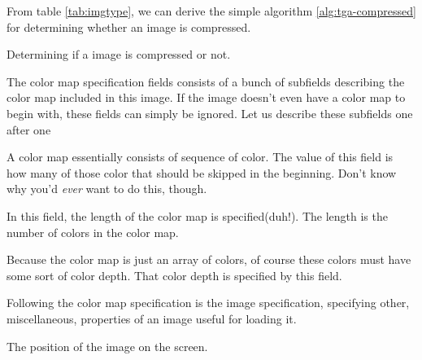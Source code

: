 \begin{refsection}
  From table \ref{tab:imgtype}, we can derive the simple algorithm
  \ref{alg:tga-compressed} for determining whether an image is
  compressed.

  \begin{algorithm}[H]
    \caption{Determining if a \tga image is compressed or not.}
    \label{alg:tga-compressed}
    \begin{algorithmic}[1]
    \end{algorithmic}
  \end{algorithm}


  The color map specification fields consists of a bunch of subfields
  describing the color map included in this image. If the image
  doesn't even have a color map to begin with, these fields can simply
  be ignored. Let us describe these subfields one after one


  A color map essentially consists of sequence of color. The value of
  this field is how many of those color that should be skipped in the
  beginning. Don't know why you'd \textit{ever} want to do this, though.


  In this field, the length of the color map is specified(duh!). The
  length is the number of colors in the color map.


  Because the color map is just an array of colors, of course these
  colors must have some sort of color depth. That color depth is
  specified by this field.


  Following the color map specification is the image specification,
  specifying other, miscellaneous, properties of an image useful for
  loading it.



  The position of the image on the screen.



\end{refsection}
